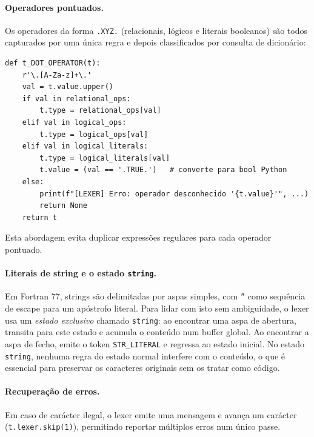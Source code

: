 \documentclass[a4paper]{article}
\begin{document}
\paragraph{Operadores pontuados.} Os operadores da forma \texttt{.XYZ.} (relacionais, lógicos e literais booleanos) são todos capturados por uma única regra e depois classificados por consulta de dicionário:

\vspace{0.2cm}

\begin{lstlisting}[style=py]
def t_DOT_OPERATOR(t):
    r'\.[A-Za-z]+\.'
    val = t.value.upper()
    if val in relational_ops:
        t.type = relational_ops[val]
    elif val in logical_ops:
        t.type = logical_ops[val]
    elif val in logical_literals:
        t.type = logical_literals[val]
        t.value = (val == '.TRUE.')   # converte para bool Python
    else:
        print(f"[LEXER] Erro: operador desconhecido '{t.value}'", ...)
        return None
    return t
\end{lstlisting}

\vspace{0.2cm}

\noindent Esta abordagem evita duplicar expressões regulares para cada operador pontuado.

\paragraph{Literais de string e o estado \texttt{string}.} Em Fortran 77, strings são delimitadas por aspas simples, com \texttt{''} como sequência de escape para um apóstrofo literal. Para lidar com isto sem ambiguidade, o lexer usa um \textit{estado exclusivo} chamado \texttt{string}: ao encontrar uma aspa de abertura, transita para este estado e acumula o conteúdo num buffer global. Ao encontrar a aspa de fecho, emite o token \texttt{STR\_LITERAL} e regressa ao estado inicial. No estado \texttt{string}, nenhuma regra do estado normal interfere com o conteúdo, o que é essencial para preservar os caracteres originais sem os tratar como código.

\paragraph{Recuperação de erros.} Em caso de carácter ilegal, o lexer emite uma mensagem e avança um carácter (\texttt{t.lexer.skip(1)}), permitindo reportar múltiplos erros num único passe.

\end{document}

